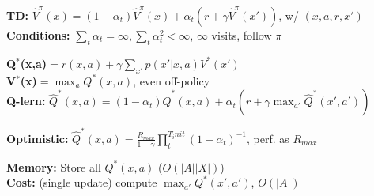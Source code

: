 \textbf{TD:} $\hat{V}^\pi(x) = (1-\alpha_t) \hat{V}^\pi(x) + \alpha_t(r + \gamma \hat{V}^\pi(x'))$, w/ $(x,a,r,x')$\\
\textbf{Conditions:} $\sum_t \alpha_t = \infty, \sum_t \alpha_t^2 < \infty$, $\infty$ visits, follow $\pi$\\
\begin{comment}
	Since we don't know the optimal policy yet, we can use the bootstrap estimate from the current policy.
	It is crucial that we follow the policy.\\
\end{comment}

\textbf{Q$^*$(x,a)}$ = r(x, a) + \gamma \sum_{x'} p(x'|x,a) V^*(x')$\\
\textbf{V$^*$(x)}$=\max_a Q^*(x,a)$, even off-policy\\

\textbf{Q-lern:} $\hat{Q}^*(x,a) = (1-\alpha_t) \hat{Q}^*(x,a) + \alpha_t(r + \gamma \max_{a'} \hat{Q}^*(x',a'))$ \\
\begin{comment}
	We know that the optimal $V^*$ depends on the Q values, in this approach we directly estimate the Q's and then maximise over them.\\
	This leaves us with an off-policy method, since we are considering all state-action pairs. It matters again that we visit the states often enough.\\
	The immediate reward and the transition model only depend on the action a, whereas the long term value depends on the policy $\pi$.\\
	Update $Q^*$ after each observed transition.\\
	\textbf{Note:} $V^\pi(x) = Q^\pi(x, \pi(x))$\\
\end{comment}

\textbf{Optimistic:} $\hat{Q}^*(x,a) = \frac{R_{max}}{1-\gamma} \prod_t^{T_init}(1 - \alpha_t)^{-1}$, perf. as $R_{max}$\\
\begin{comment}
	If we initialize the weights like this, we get an optimistic Q-learning with convergence guarantees and the same runtime guarantees as in $R_{max}$\\
\end{comment}

\textbf{Memory:} Store all $Q^*(x,a)$ ($O(|A||X|)$)\\
\textbf{Cost:} (single update) compute $\max_{a'} Q^*(x',a')$, $O(|A|)$\\
\begin{comment}
	We need to compute the max of v, so it is linear in the number of actions.\\
\end{comment}


